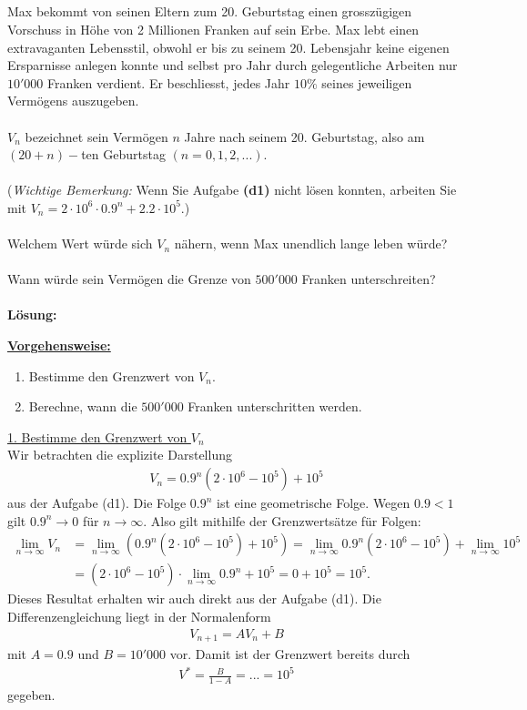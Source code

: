 \subsection*{}
Max bekommt von seinen Eltern zum 20. Geburtstag einen grosszügigen Vorschuss in Höhe von 2 Millionen Franken auf sein Erbe. Max lebt einen extravaganten Lebensstil, obwohl er bis zu seinem 20. Lebensjahr keine eigenen Ersparnisse anlegen konnte und selbst pro Jahr durch gelegentliche Arbeiten nur $ 10'000 $ Franken verdient. Er beschliesst, jedes Jahr $ 10 \% $ seines jeweiligen Vermögens auszugeben.\\
\\
$ V_n $ bezeichnet sein Vermögen $ n $ Jahre nach seinem 20. Geburtstag, also am $ (20+n)- $ten Geburtstag $ (n= 0,1,2,...) $.\\
\\
(\textit{Wichtige Bemerkung:} Wenn Sie Aufgabe \textbf{(d1)} nicht lösen konnten, arbeiten Sie mit $ V_n = 2 \cdot 10^6 \cdot 0.9^n+2.2 \cdot 10^5 $.)\\
\\
Welchem Wert würde sich $ V_n $ nähern, wenn Max unendlich lange leben würde?\\
\\
Wann würde sein Vermögen die Grenze von $ 500'000 $ Franken unterschreiten?
\\ \\
\textbf{Lösung:}
\begin{mdframed}
	\underline{\textbf{Vorgehensweise:}}
	\begin{enumerate}
		\item Bestimme den Grenzwert von $ V_n $.
		\item Berechne, wann die $ 500'000 $ Franken unterschritten werden.
	\end{enumerate}
\end{mdframed}

\underline{1. Bestimme den Grenzwert von $ V_n $}\\
Wir betrachten die explizite Darstellung
\begin{align*}
V_n = 0.9^n(2 \cdot 10^6 - 10^5) + 10^5
\end{align*}
aus der Aufgabe (d1). Die Folge $ 0.9^n $ ist eine geometrische Folge.
Wegen $ 0.9 < 1 $ gilt $ 0.9^n \to 0  $ für $ n \to \infty $. Also gilt mithilfe der Grenzwertsätze für Folgen:
\begin{align*}
\lim \limits_{n \to \infty} V_n
&=
\lim \limits_{n \to \infty} (0.9^n(2 \cdot 10^6 - 10^5) + 10^5)
=
\lim \limits_{n \to \infty} 0.9^n(2 \cdot 10^6 - 10^5) + \lim \limits_{n \to \infty} 10^5\\
&=
(2 \cdot 10^6 - 10^5) \cdot \lim \limits_{n \to \infty} 0.9^n + 10^5
= 0 + 10^5
= 10^5.
\end{align*}
Dieses Resultat erhalten wir auch direkt aus der Aufgabe (d1). Die Differenzengleichung liegt in der Normalenform
\begin{align*}
V_{n+1} = A V_n + B
\end{align*}
mit $ A = 0.9 $ und $ B = 10'000 $ vor. Damit ist der Grenzwert bereits durch
\begin{align*}
V^\ast = \frac{B}{1 - A} = ... = 10^5
\end{align*}
gegeben.


